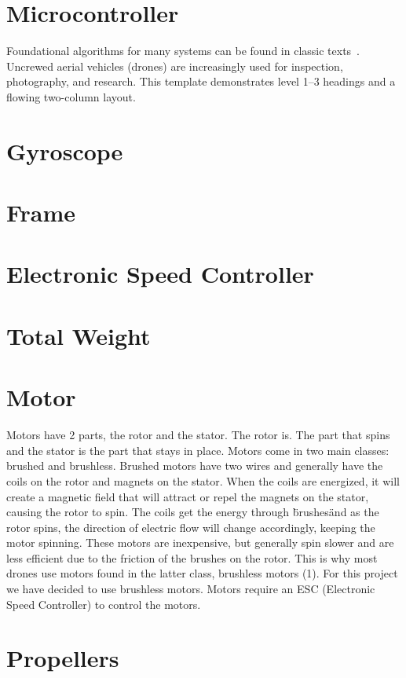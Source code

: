 \documentclass[conference]{IEEEtran}
\begin{document}
\section{Microcontroller}
Foundational algorithms for many systems can be found in classic texts~\cite{knuth1997}. Uncrewed aerial vehicles (drones) are increasingly used for inspection, photography, and research. This template demonstrates level 1--3 headings and a flowing two-column layout.

\section{Gyroscope}

\section{Frame}

\section{Electronic Speed Controller}

\section{Total Weight}

\section{Motor}
Motors have 2 parts, the rotor and the stator. The rotor is. The part that spins and the stator is the part that stays in place.
Motors come in two main classes: brushed and brushless. Brushed motors have two wires and generally have the coils on the rotor and magnets on the stator. When the coils are energized, it will create a magnetic field that will attract or repel the magnets on the stator, causing the rotor to spin. The coils get the energy through \"brushes\" and as the rotor spins, the direction of electric flow will change accordingly, keeping the motor spinning. These motors are inexpensive, but generally spin slower and are less efficient due to the friction of the brushes on the rotor. This is why most drones use motors found in the latter class, brushless motors (1).
For this project we have decided to use brushless motors. Motors require an ESC (Electronic Speed Controller) to control the motors.

\section{Propellers}



\end{document}
